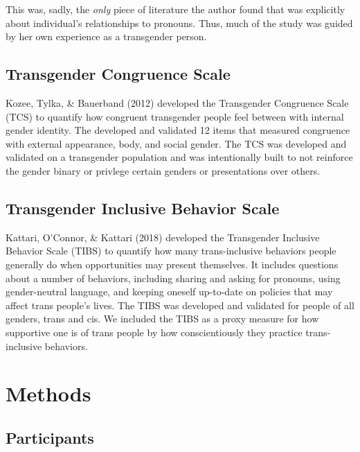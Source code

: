 \documentclass[12pt,twoside]{reedthesis}
\begin{document}
This was, sadly, the \emph{only} piece of literature the author found that was explicitly about individual's relationships to pronouns. Thus, much of the study was guided by her own experience as a transgender person.

\hypertarget{transgender-congruence-scale}{%
\section{Transgender Congruence Scale}\label{transgender-congruence-scale}}

Kozee, Tylka, \& Bauerband (2012) developed the Transgender Congruence Scale (TCS) to quantify how congruent transgender people feel between with internal gender identity. The developed and validated 12 items that measured congruence with external appearance, body, and social gender. The TCS was developed and validated on a transgender population and was intentionally built to not reinforce the gender binary or privlege certain genders or presentations over others.

\hypertarget{transgender-inclusive-behavior-scale}{%
\section{Transgender Inclusive Behavior Scale}\label{transgender-inclusive-behavior-scale}}

Kattari, O'Connor, \& Kattari (2018) developed the Transgender Inclusive Behavior Scale (TIBS) to quantify how many trans-inclusive behaviors people generally do when opportunities may present themselves. It includes questions about a number of behaviors, including sharing and asking for pronouns, using gender-neutral language, and keeping oneself up-to-date on policies that may affect trans people's lives. The TIBS was developed and validated for people of all genders, trans and cis. We included the TIBS as a proxy measure for how supportive one is of trans people by how conscientiously they practice trans-inclusive behaviors.

\hypertarget{methods}{%
\chapter{Methods}\label{methods}}

\hypertarget{participants}{%
\section{Participants}\label{participants}}
\end{document}
